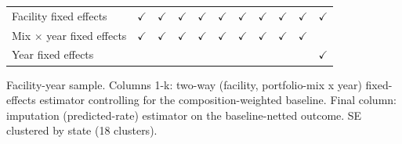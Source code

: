\begin{tabular}{lcccccccccc}
    \\
   Facility fixed effects           & $\checkmark$   & $\checkmark$   & $\checkmark$   & $\checkmark$                       & $\checkmark$                         & $\checkmark$                       & $\checkmark$      & $\checkmark$   & $\checkmark$   & $\checkmark$\\   
   Mix $\times$ year fixed effects  & $\checkmark$   & $\checkmark$   & $\checkmark$   & $\checkmark$                       & $\checkmark$                         & $\checkmark$                       & $\checkmark$      & $\checkmark$   & $\checkmark$   & \\  
   Year fixed effects               &                &                &                &                                    &                                      &                                    &                   &                &                & $\checkmark$\\   
   \bottomrule
\end{tabular}
 
\par \raggedright 
Facility-year sample. Columns 1-k: two-way (facility, portfolio-mix x year) fixed-effects estimator controlling for the composition-weighted baseline. Final column: imputation (predicted-rate) estimator on the baseline-netted outcome. SE clustered by state (18 clusters).
\par\endgroup


